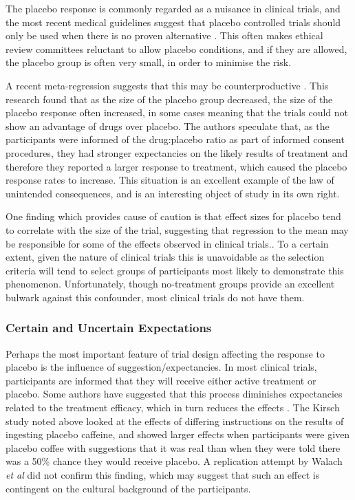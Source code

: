 The placebo response is commonly regarded as a nuisance in clinical trials, and the most recent medical guidelines suggest that placebo controlled trials should only be used when there is no proven alternative \cite{temple2000placebo}. This often makes ethical review committees reluctant to allow placebo conditions, and if they are allowed, the placebo group is often very small, in order to minimise the risk. 

A recent meta-regression suggests that this may be counterproductive \cite{Papakostas2009}.  This research found that as the size of the placebo group decreased, the size of the placebo response often increased, in some cases meaning that the trials could not show an advantage of drugs over placebo. The authors speculate that, as the participants were informed of the drug:placebo ratio as part of informed consent procedures, they had stronger expectancies on the likely results of treatment and therefore they reported a larger response to treatment, which caused the placebo response rates to increase. This situation is an excellent example of the law of unintended consequences, and is an interesting object of study in its own right. 

One finding which provides cause of caution is that effect sizes for placebo tend to correlate with the size of the trial, suggesting that regression to the mean may be responsible for some of the effects observed in clinical trials.\cite{Enck2005a}. To a certain extent, given the nature of clinical trials this is unavoidable as the selection criteria will tend to select groups of participants most likely to demonstrate this phenomenon. Unfortunately, though no-treatment groups provide an excellent bulwark against this confounder, most clinical trials do not have them. 


\subsubsection{Certain and Uncertain Expectations}
\label{sec:cert-uncert-expect}
Perhaps the most important feature of trial design affecting the response to placebo  is the influence of suggestion/expectancies. In most clinical trials, participants are informed that they will receive either active treatment or placebo. Some authors have suggested \cite{kirsch1988double}  that this process diminishes expectancies related to the treatment efficacy, which in turn reduces the effects \cite{Kleijnen1994}. The Kirsch study noted above looked at the effects of differing instructions on the results of ingesting placebo caffeine, and showed larger effects when participants were given placebo coffee with suggestions that it was real than when they were told there was a 50\% chance they would receive placebo. A replication attempt by Walach \textit{et al} did not confirm this finding, which may suggest that such an effect is contingent on the cultural background of the participants. 

